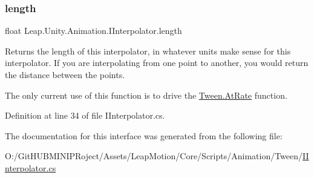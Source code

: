 \mbox{\label{interface_leap_1_1_unity_1_1_animation_1_1_i_interpolator_ab028a4992f1315ce541913032f902282}} 
\subsubsection{\texorpdfstring{length}{length}}
{\footnotesize\ttfamily float Leap.\+Unity.\+Animation.\+I\+Interpolator.\+length\hspace{0.3cm}{\ttfamily [get]}}



Returns the \textquotesingle{}length\textquotesingle{} of this interpolator, in whatever units make sense for this interpolator. If you are interpolating from one point to another, you would return the distance between the points. 

The only current use of this function is to drive the \mbox{\hyperlink{struct_leap_1_1_unity_1_1_animation_1_1_tween_a8a9610fdde3d806fdd7ca4c6e06f1645}{Tween.\+At\+Rate}} function. 

Definition at line 34 of file I\+Interpolator.\+cs.



The documentation for this interface was generated from the following file\+:\begin{DoxyCompactItemize}
\item 
O\+:/\+Git\+H\+U\+B\+M\+I\+N\+I\+P\+Roject/\+Assets/\+Leap\+Motion/\+Core/\+Scripts/\+Animation/\+Tween/\mbox{\hyperlink{_i_interpolator_8cs}{I\+Interpolator.\+cs}}\end{DoxyCompactItemize}
